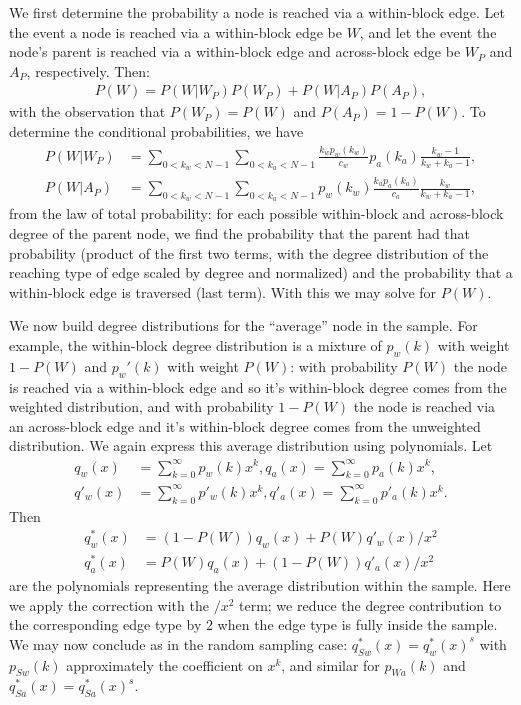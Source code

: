 We first determine the probability a node is reached via a within-block edge. Let the event a node is reached via a within-block edge be $W$, and let the event the node's parent is reached via a within-block edge and across-block edge be $W_P$ and $A_P$, respectively. Then:
\begin{align*}
    P(W) = P(W | W_P) P(W_P) + P(W | A_P) P(A_P),
\end{align*}
with the observation that $P(W_P) = P(W)$ and $P(A_P) = 1-P(W)$. To determine the conditional probabilities, we have
\begin{align*}
    P(W | W_P) &= 
    \sum_{0 < k_w < N-1} \sum_{0 < k_a < N-1} \frac{k_wp_w(k_w)}{c_w} p_a(k_a) \frac{k_w - 1}{k_w + k_a - 1}, \\
    P(W | A_P) &= 
    \sum_{0 < k_w < N-1} \sum_{0 < k_a < N-1} p_w(k_w) \frac{k_ap_a(k_a)}{c_a} \frac{k_w}{k_w + k_a - 1},
\end{align*}
from the law of total probability: for each possible within-block and across-block degree of the parent node, we find the probability that the parent had that probability (product of the first two terms, with the degree distribution of the reaching type of edge scaled by degree and normalized) and the probability that a within-block edge is traversed (last term). With this we may solve for $P(W)$.

We now build degree distributions for the ``average'' node in the sample. For example, the within-block degree distribution is a mixture of $p_w(k)$ with weight $1-P(W)$ and $p_w'(k)$ with weight $P(W)$: with probability $P(W)$ the node is reached via a within-block edge and so it's within-block degree comes from the weighted distribution, and with probability $1-P(W)$ the node is reached via an across-block edge and it's within-block degree comes from the unweighted distribution. We again express this average distribution using polynomials. Let
\begin{align*}
    q_w(x) &= \sum_{k=0}^\infty p_w(k)x^k, q_a(x) = \sum_{k=0}^\infty p_a(k)x^k, \\
    q'_w(x) &= \sum_{k=0}^\infty p'_w(k)x^k, q'_a(x) = \sum_{k=0}^\infty p'_a(k)x^k.
\end{align*}
Then 
\begin{align*}
    q^*_w(x) &= (1-P(W)) q_w(x) + P(W) q'_w(x)/x^2 \\
    q^*_a(x) &= P(W) q_a(x) + (1-P(W)) q'_a(x)/x^2
\end{align*}
are the polynomials representing the average distribution within the sample. Here we apply the correction with the $/x^2$ term; we reduce the degree contribution to the corresponding edge type by $2$ when the edge type is fully inside the sample. We may now conclude as in the random sampling case: $q^*_{Sw}(x) = q^*_w(x)^s$ with $p_{Sw}(k)$ approximately the coefficient on $x^k$, and similar for $p_{Wa}(k)$ and $q^*_{Sa}(x) = q^*_{Sa}(x)^s$.


